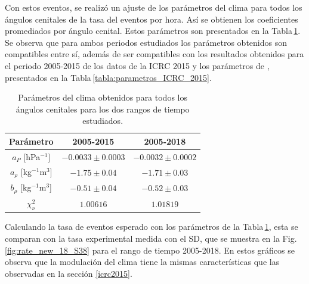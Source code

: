         
        Con estos eventos, se realizó un  ajuste de los parámetros del clima para todos los ángulos cenitales de la tasa del eventos por hora. Así se obtienen los coeficientes promediados por ángulo cenital. Estos parámetros son presentados en la Tabla\,\ref{tabla:parametros_ICRC_2019_S38}. Se observa que para ambos periodos estudiados los parámetros obtenidos son compatibles entre sí, además de ser compatibles con los resultados obtenidos para el periodo 2005-2015 de los datos de la ICRC 2015 y los parámetros de \cite{aab2017impact}, presentados en la Tabla\,\ref{tabla:parametros_ICRC_2015}.

        \begin{table}[H]
            \centering
            \begin{tabular}{|c|c|c|}
            \hline
            \textbf{Parámetro}          & \textbf{2005-2015}    		& \textbf{2005-2018}    \\ \hline
            $a_P$ [hPa$^{-1}$]          & $ -0.0033\pm 0.0003$      	& $ -0.0032\pm 0.0002$  \\ \hline
            $a_\rho$ [kg$^{-1}$m$^3$]   & $ -1.75\pm 0.04$            	& $ -1.71\pm 0.03$       \\ \hline
            $b_\rho$ [kg$^{-1}$m$^3$]   & $ -0.51\pm 0.04$             	& $ -0.52\pm 0.03$       \\ \hline
            $\chi^2_\nu$                & $1.00616$                     & $1.01819$              \\   \hline
            \end{tabular} 
            \caption{Parámetros del clima obtenidos para todos los ángulos cenitales para los dos rangos de tiempo estudiados.} \label{tabla:parametros_ICRC_2019_S38}
        \end{table}
        
        Calculando la tasa de eventos esperado con los parámetros de la Tabla\,\ref{tabla:parametros_ICRC_2019_S38}, esta se comparan con la tasa experimental medida con el SD, que se muestra en la Fig. \ref{fig:rate_new_18_S38} para el rango de tiempo 2005-2018. En estos gráficos se observa que la modulación del clima tiene la mismas características que las observadas en la sección \ref{icrc2015}.

